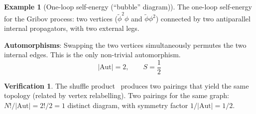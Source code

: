 \documentclass[11pt,a4paper]{article}
\theoremstyle{definition}
\newtheorem{example}[theorem]{Example}
\newtheorem*{verification}{Verification}
\newcommand{\phit}{\tilde{\phi}}
\newcommand{\Aut}{\mathrm{Aut}}
\begin{document}
\begin{example}[One-loop self-energy (``bubble'' diagram)]
\label{ex:bubble}
The one-loop self-energy for the Gribov process: two vertices
($\phit^2\phi$ and $\phit\phi^2$) connected by two antiparallel
internal propagators, with two external legs.

\begin{center}
\end{center}

\textbf{Automorphisms}: Swapping the two vertices simultaneously permutes
the two internal edges. This is the only non-trivial automorphism.
\begin{equation}
|\Aut| = 2, \qquad S = \frac{1}{2}
\end{equation}

\begin{verification}
The shuffle product~\cite{amarteifio2019} produces two pairings that
yield the same topology (related by vertex relabelling).
Two pairings for the same graph: $N!/|\Aut| = 2!/2 = 1$
distinct diagram, with symmetry factor $1/|\Aut| = 1/2$. \checkmark
\end{verification}
\end{example}
\end{document}

